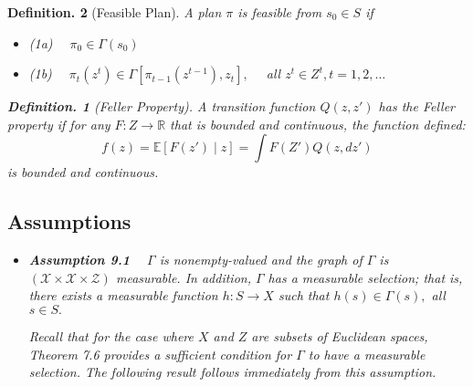 \documentclass{article}
\newtheorem{defin}{Definition.}
\theoremstyle{definition}
\begin{document}
\begin{defin}[Feasible Plan]
A plan $\pi$ is feasible from $s_{0} \in S$ if
\begin{itemize}
    \item (1a) $\quad \pi_{0} \in \Gamma\left(s_{0}\right)$
    \item  (1b) $\quad \pi_{t}\left(z^{t}\right) \in \Gamma\left[\pi_{t-1}\left(z^{t-1}\right), z_{t}\right], \quad$ all $z^{t} \in Z^{t}, t=1,2, \ldots$
\end{itemize} 

\begin{defin}[Feller Property]
A transition function $Q(z, z')$ has the Feller property if for any $F:Z\to\mathbb{R}$ that is bounded and continuous, the function defined:
$$f(z) = \mathbb{E}[F(z') \mid z ] = \int F(Z')Q(z, dz')$$
is bounded and continuous.
\end{defin}

\subsection{Assumptions}
\begin{itemize}
    \item \textbf{Assumption 9.1} $\quad \Gamma$ is nonempty-valued and the graph of $\Gamma$ is $(\mathscr{X} \times \mathscr{X} \times \mathscr{Z})$ measurable. In addition, $\Gamma$ has a measurable selection; that is, there exists a measurable function $h: S \rightarrow X$ such that $h(s) \in \Gamma(s),$ all $s \in S .$

Recall that for the case where $X$ and $Z$ are subsets of Euclidean spaces, Theorem 7.6 provides a sufficient condition for $\Gamma$ to have a measurable selection. The following result follows immediately from this assumption.


\end{itemize}
\end{defin}
\end{document}
